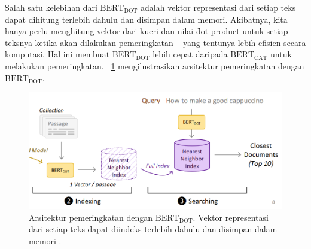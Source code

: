 		Salah satu kelebihan dari $\text{BERT}_{\text{DOT}}$ adalah vektor representasi dari setiap teks dapat dihitung terlebih dahulu dan disimpan dalam memori. Akibatnya, kita hanya perlu menghitung vektor dari kueri dan nilai \f{dot product} untuk setiap teksnya ketika akan dilakukan pemeringkatan -- yang tentunya lebih efisien secara komputasi. Hal ini membuat $\text{BERT}_{\text{DOT}}$ lebih cepat daripada $\text{BERT}_{\text{CAT}}$ untuk melakukan pemeringkatan. \pic~\ref{fig:dense-retrieval} mengilustrasikan arsitektur pemeringkatan dengan $\text{BERT}_{\text{DOT}}$.
		\begin{figure}
			\centering
			\includegraphics[width=1\textwidth]{assets/pics/dense-retrieval.png}
			\caption{Arsitektur pemeringkatan dengan $\text{BERT}_{\text{DOT}}$. Vektor representasi dari setiap teks dapat diindeks terlebih dahulu dan disimpan dalam memori \citep{irlecture}.}
			\label{fig:dense-retrieval}
		\end{figure}